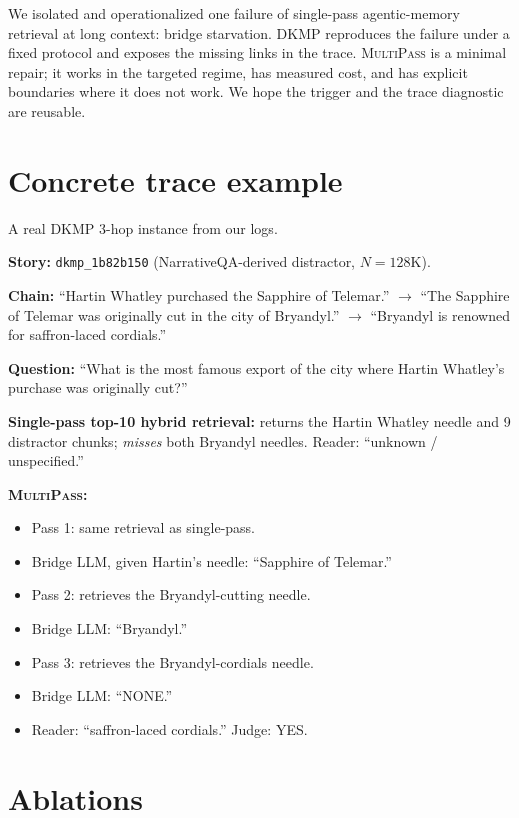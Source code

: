 \documentclass{article}
\theoremstyle{plain}
\theoremstyle{definition}
\newcommand{\ours}{\textsc{MultiPass}}
\newcommand{\dkmp}{\textsc{DKMP}}
\begin{document}
We isolated and operationalized one failure of single-pass agentic-memory
retrieval at long context: bridge starvation. \dkmp{} reproduces the
failure under a fixed protocol and exposes the missing links in the trace.
\ours{} is a minimal repair; it works in the targeted regime, has measured
cost, and has explicit boundaries where it does not work. We hope the
trigger and the trace diagnostic are reusable.




\appendix

\section{Concrete trace example}\label{appx:trace}

A real DKMP 3-hop instance from our logs.

\medskip
\textbf{Story:} \texttt{dkmp\_1b82b150} (NarrativeQA-derived distractor,
$N{=}128$K).

\textbf{Chain:} ``Hartin Whatley purchased the Sapphire of Telemar.'' $\to$
``The Sapphire of Telemar was originally cut in the city of Bryandyl.''
$\to$ ``Bryandyl is renowned for saffron-laced cordials.''

\textbf{Question:} ``What is the most famous export of the city where
Hartin Whatley's purchase was originally cut?''

\textbf{Single-pass top-10 hybrid retrieval:} returns the Hartin Whatley
needle and 9 distractor chunks; \emph{misses} both Bryandyl needles.
Reader: ``unknown / unspecified.''

\textbf{\ours{}:}
\begin{itemize}\setlength{\itemsep}{0.02em}
  \item Pass 1: same retrieval as single-pass.
  \item Bridge LLM, given Hartin's needle: ``Sapphire of Telemar.''
  \item Pass 2: retrieves the Bryandyl-cutting needle.
  \item Bridge LLM: ``Bryandyl.''
  \item Pass 3: retrieves the Bryandyl-cordials needle.
  \item Bridge LLM: ``NONE.''
  \item Reader: ``saffron-laced cordials.'' Judge: YES.
\end{itemize}

\section{Ablations}\label{appx:ablation}
\end{document}
